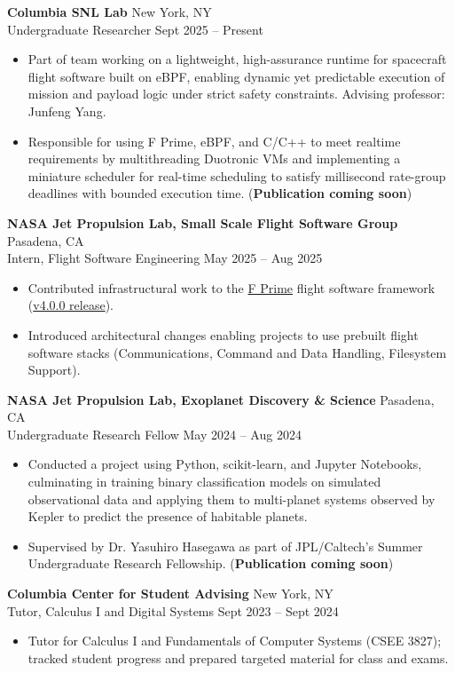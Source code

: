 \documentclass[a4paper,12pt]{article}
\newenvironment{joblong}[4]
    {
    \noindent\textbf{#1} \dotfill #2 \\
    \noindent #3 \dotfill #4 \\[3.75pt]
    \begin{minipage}[t]{\linewidth}
    \begin{itemize}[nosep,after=\strut, leftmargin=1em, itemsep=3pt,label=--]
    }
    {
    \end{itemize}
    \end{minipage}    
    }
\begin{document}
\begin{joblong}{Columbia SNL Lab}{New York, NY}{Undergraduate Researcher}{Sept 2025 -- Present}
\item Part of team working on a lightweight, high-assurance runtime for spacecraft flight software built on eBPF, enabling dynamic yet predictable execution of mission and payload logic under strict safety constraints. Advising professor: Junfeng Yang. 
\item Responsible for using F Prime, eBPF, and C/C++ to meet realtime requirements by multithreading Duotronic VMs and implementing a miniature scheduler for real-time scheduling to satisfy millisecond rate-group deadlines with bounded execution time. (\textbf{Publication coming soon})
\end{joblong}

\begin{joblong}{NASA Jet Propulsion Lab, Small Scale Flight Software Group}{Pasadena, CA}{Intern, Flight Software Engineering}{May 2025 -- Aug 2025}
\item Contributed infrastructural work to the \href{https://fprime.jpl.nasa.gov/}{F Prime} flight software framework (\href{https://github.com/nasa/fprime/releases/tag/v4.0.0}{v4.0.0 release}).
\item Introduced architectural changes enabling projects to use prebuilt flight software stacks (Communications, Command and Data Handling, Filesystem Support).
\end{joblong}

\begin{joblong}{NASA Jet Propulsion Lab, Exoplanet Discovery \& Science}{Pasadena, CA}{Undergraduate Research Fellow}{May 2024 -- Aug 2024}
\item Conducted a project using Python, scikit-learn, and Jupyter Notebooks, culminating in training binary classification models on simulated observational data and applying them to multi-planet systems observed by Kepler to predict the presence of habitable planets.
\item Supervised by Dr. Yasuhiro Hasegawa as part of JPL/Caltech's Summer Undergraduate Research Fellowship. (\textbf{Publication coming soon})
\end{joblong}

\begin{joblong}{Columbia Center for Student Advising}{New York, NY}{Tutor, Calculus I and Digital Systems}{Sept 2023 -- Sept 2024}
\item Tutor for Calculus I and Fundamentals of Computer Systems (CSEE 3827); tracked student progress and prepared targeted material for class and exams.
\end{joblong}
\end{document}
